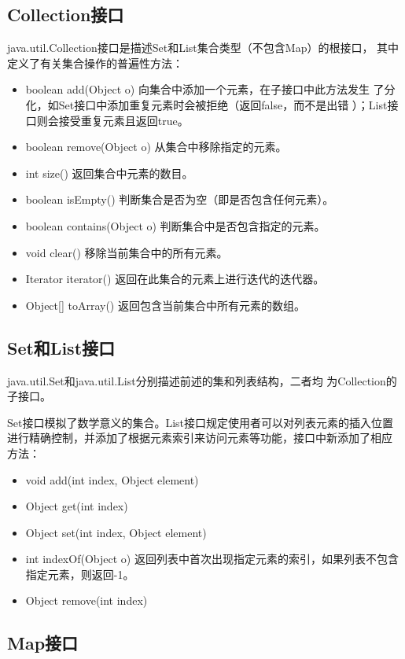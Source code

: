 \subsection{Collection接口}

java.util.Collection接口是描述Set和List集合类型（不包含Map）的根接口，
其中定义了有关集合操作的普遍性方法：
  
\begin{itemize}
\item boolean add(Object o) 向集合中添加一个元素，在子接口中此方法发生
  了分化，如Set接口中添加重复元素时会被拒绝（返回false，而不是出错
  ）；List接口则会接受重复元素且返回true。
\item boolean remove(Object o) 从集合中移除指定的元素。
\item int size() 返回集合中元素的数目。
\item boolean isEmpty() 判断集合是否为空（即是否包含任何元素）。
\item boolean contains(Object o) 判断集合中是否包含指定的元素。
\item void clear() 移除当前集合中的所有元素。
\item Iterator iterator() 返回在此集合的元素上进行迭代的迭代器。
\item Object[] toArray() 返回包含当前集合中所有元素的数组。
\end{itemize}


\subsection{Set和List接口}

java.util.Set和java.util.List分别描述前述的集和列表结构，二者均
为Collection的子接口。

Set接口模拟了数学意义的集合。List接口规定使用者可以对列表元素的插入位置
进行精确控制，并添加了根据元素索引来访问元素等功能，接口中新添加了相应
方法：

\begin{itemize}
\item void add(int index, Object element)
\item Object get(int index)
\item Object set(int index, Object element) 
\item int indexOf(Object o) 返回列表中首次出现指定元素的索引，如果列表不包含指定元素，则返回-1。
\item Object remove(int index)
\end{itemize}

\subsection{Map接口}

